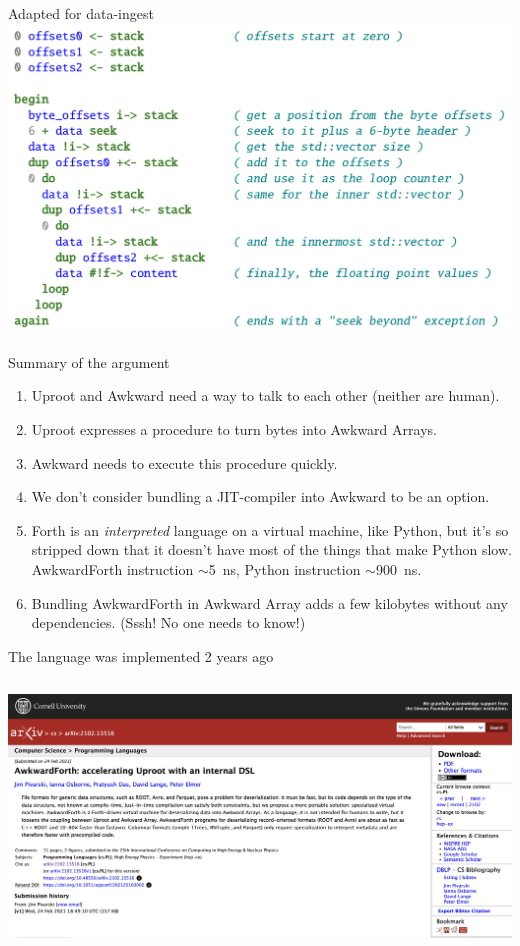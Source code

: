 \documentclass[aspectratio=169]{beamer}
\begin{document}
\begin{frame}{Adapted for data-ingest}
\vspace{0.25 cm}
\includegraphics[width=0.9\linewidth]{PLOTS/forth-parsing-example.png}
\end{frame}

\begin{frame}{Summary of the argument}
\large
\vspace{0.25 cm}
\begin{enumerate}\setlength{\itemsep}{0.35 cm}
\item<1-> Uproot and Awkward need a way to talk to each other (neither are human).
\item<2-> Uproot expresses a procedure to turn bytes into Awkward Arrays.
\item<3-> Awkward needs to execute this procedure quickly.
\item<4-> We don't consider bundling a JIT-compiler into Awkward to be an option.
\item<5-> Forth is an {\it interpreted} language on a virtual machine, like Python, but it's so stripped down that it doesn't have most of the things that make Python slow. AwkwardForth instruction $\sim$5~ns, Python instruction $\sim$900~ns.
\item<6-> Bundling AwkwardForth in Awkward Array adds a few kilobytes without any dependencies. (Sssh! No one needs to know!)
\end{enumerate}
\end{frame}

\begin{frame}{The language was implemented 2 years ago}
\vspace{0.16 cm}
\begin{columns}
\includegraphics[width=\linewidth]{PLOTS/AwkwardForth-paper.png}
\end{columns}
\end{frame}
\end{document}
